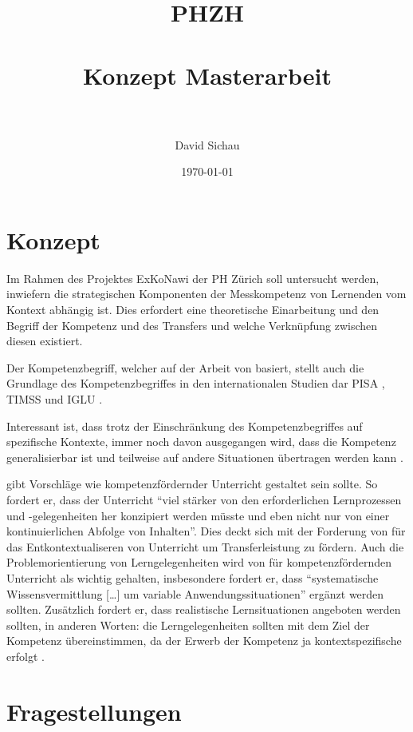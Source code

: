 \documentclass[paper=a4, fontsize=12pt, parskip=half]{scrartcl} %
\title{	
\normalfont \normalsize 
\textsc{PHZH} \\ [0.4cm] %
\horrule{0.5pt} \\[0.3cm] %
\huge Konzept Masterarbeit \\ %
\horrule{2pt} \\[0.4cm] %
}
\author{David Sichau} %
\date{\normalsize\today} %
\begin{document}
\maketitle %

\tableofcontents


\section{Konzept}

Im Rahmen des Projektes ExKoNawi der PH Zürich \citep{Gut2013a} soll untersucht werden, inwiefern die strategischen Komponenten der Messkompetenz von Lernenden vom Kontext abhängig ist. Dies erfordert eine theoretische Einarbeitung und den Begriff der Kompetenz und des Transfers und welche Verknüpfung zwischen diesen existiert. 

Der Kompetenzbegriff, welcher auf der Arbeit von \citet{Klieme2004, Weinert2001b} basiert, stellt auch die Grundlage des Kompetenzbegriffes in den internationalen Studien dar PISA \citep{PISA-KonsortiumDeuschland2004}, TIMSS \citep{Martin2003} und IGLU \citep{Bos2003}.

Interessant ist, dass trotz der Einschränkung des Kompetenzbegriffes auf spezifische Kontexte, immer noch davon ausgegangen wird, dass die Kompetenz generalisierbar ist und teilweise auf andere Situationen übertragen werden kann \citet{Hartig2006}.

\citet{Lersch2007} gibt Vorschläge wie kompetenzfördernder Unterricht gestaltet sein sollte. So fordert er, dass der Unterricht "`viel stärker von den erforderlichen Lernprozessen und -gelegenheiten her konzipiert werden müsste und eben nicht nur von einer kontinuierlichen Abfolge von Inhalten"'. Dies deckt sich mit der Forderung von \citet{Mietzel2007} für das Entkontextualiseren von Unterricht um Transferleistung zu fördern. Auch die Problemorientierung von Lerngelegenheiten wird von \citet{Lersch2007} für kompetenzfördernden Unterricht als wichtig gehalten, insbesondere fordert er, dass "`systematische Wissensvermittlung […] um variable Anwendungssituationen"' ergänzt werden sollten. Zusätzlich fordert er, dass realistische Lernsituationen angeboten werden sollten, in anderen Worten: die Lerngelegenheiten sollten mit dem Ziel der Kompetenz übereinstimmen, da der Erwerb der Kompetenz ja kontextspezifische erfolgt \citep{Klieme2004}.


\section{Fragestellungen}
\end{document}
